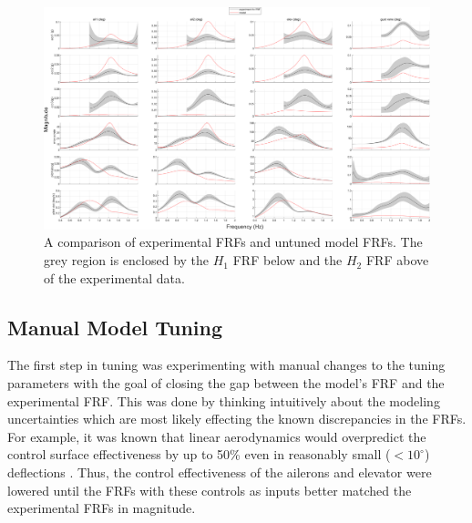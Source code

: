 \begin{landscape}

\begin{figure}[H]
	\centering
	\label{fig:noTuneFRF}
	\includegraphics[width=9in]{figs/FRFcompare_noTune_q207.png}
	\caption{A comparison of experimental FRFs and untuned model FRFs. The grey region is enclosed by the $H_1$ FRF below and the $H_2$ FRF above of the experimental data.}
\end{figure}

\end{landscape}

\subsection{Manual Model Tuning} %

The first step in tuning was experimenting with manual changes to the tuning parameters with the goal of closing the gap between the model's FRF and the experimental FRF. This was done by thinking intuitively about the modeling uncertainties which are most likely effecting the known discrepancies in the FRFs. For example, it was known that linear aerodynamics would overpredict the control surface effectiveness by up to 50\% even in reasonably small ($<10^\circ$) deflections \cite{young1947,riebe1955}. Thus, the control effectiveness of the ailerons and elevator were lowered until the FRFs with these controls as inputs better matched the experimental FRFs in magnitude.


